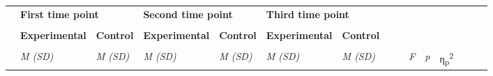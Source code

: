 \documentclass[authordate, empirical]{jote-new-article}
\begin{document}
\begin{table}
  \begin{tabularx}{\linewidth}{@{} l l l l l l l l l l l l l l l @{}}
    \hline                                         & \multicolumn{2}{l}{\textbf{First time point}} &
    \multicolumn{2}{l}{\textbf{Second time point}} &
    \multicolumn{2}{l}{\textbf{Third time point}}  &                                               &                      &                                   &                                   &                                                                      \\

                                                   & \multicolumn{2}{l}{}                          & \multicolumn{2}{l}{} & \multicolumn{2}{l}{}              &                                   &               &                                       &

                                                   &                                                                                                                                                                                                                     \\

                                                   & \textbf{Experimental }                        & \textbf{Control }    & \textbf{Experimental }            &
    \textbf{Control }                              & \textbf{Experimental }                        & \textbf{Control }    &                                   &                                   &               &
                                                   &                                                                                                                                                                                                                     \\

    \hline                                         &                                               &                      &                                   &                                   &               &                                       &   &  &  &  & \\

                                                   & \emph{M (SD)}                                 & \emph{M (SD)}        & \emph{M (SD)}                     & \emph{M (SD)}                     & \emph{M (SD)}
                                                   & \emph{M (SD)}                                 &                      &                                   & \emph{F}                          & \emph{p}      & η\textsubscript{p}\textsuperscript{2}
    \\


\end{tabularx}
\end{table}
\end{document}
